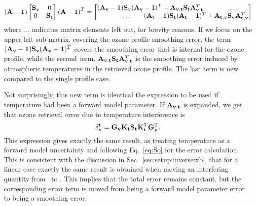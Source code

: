 \begin{displaymath}
  \left(\AvrKrnMtr-\IdnMtr\right)
  \begin{bmatrix}
    \aCvrMtr{\VctStl{v}} & 0 \\
    0 & \aCvrMtr{\VctStl{t}} 
  \end{bmatrix} 
  \left(\AvrKrnMtr-\IdnMtr\right)^T =
  \begin{bmatrix}
    (\AvrKrnMtr_{\VctStl{v}}-\IdnMtr)\aCvrMtr{\VctStl{v}}
    (\AvrKrnMtr_{\VctStl{v}}-\IdnMtr)^T + 
    \AvrKrnMtr_{\VctStl{v},\VctStl{t}}\aCvrMtr{\VctStl{t}}\AvrKrnMtr_{\VctStl{v},\VctStl{t}}^T
    & \hspace{5mm}\dots \\
    \hspace{-25mm}\dots & \hspace{-35mm}%
    (\AvrKrnMtr_{\VctStl{t}}-\IdnMtr)\aCvrMtr{\VctStl{t}}
    (\AvrKrnMtr_{\VctStl{t}}-\IdnMtr)^T + 
    \AvrKrnMtr_{\VctStl{t},\VctStl{v}}\aCvrMtr{\VctStl{v}}\AvrKrnMtr_{\VctStl{t},\VctStl{v}}^T
  \end{bmatrix} 
\end{displaymath}
where $\dots$ indicates matrix elements left out, for brevity reasons. If we
focus on the upper left sub-matrix, covering the ozone profile smoothing error,
the term $(\mathbf{A}_{\mathbf{v}}-\mathbf{1})\mathbf{S}_{\mathbf{v}}
(\mathbf{A}_{\mathbf{v}}-\mathbf{1})^T$ covers the smoothing error that is
internal for the ozone profile, while the second term,
$\mathbf{A}_{\mathbf{v},\mathbf{t}}\mathbf{S}_{\mathbf{t}}\mathbf{A}_{\mathbf{v},\mathbf{t}}^T$
is the smoothing error induced by atmospheric temperatures in the retrieved
ozone profile. The last term is new compared to the single profile case.

Not surprisingly, this new term is identical the expression to be used if
temperature had been a forward model parameter. If
$\mathbf{A}_{\mathbf{v},\mathbf{t}}$ is expanded, we get that ozone retrieval
error due to temperature interference is
\begin{displaymath}
  \delta_{\mathbf{v}}^{\mathbf{t}} =
  \mathbf{G}_{\mathbf{v}}\mathbf{K}_{\mathbf{t}}\mathbf{S}_{\mathbf{t}}
   \mathbf{K}_{\mathbf{t}}^T\mathbf{G}_{\mathbf{v}}^T.
\end{displaymath}
This expression gives exactly the same result, as treating temperature as a
forward model uncertainty and following Eq.~\ref{eq:So} for the error
calculation. This is consistent with the discussion in
Sec.~\ref{sec:setup:inverse:xb}, that for a linear case exactly the same result
is obtained when moving an interfering quantity from \FrwMdlVct\ to \SttVct.
This implies that the total error remains constant, but the corresponding error
term is moved from being a forward model parameter error to being a smoothing
error.

